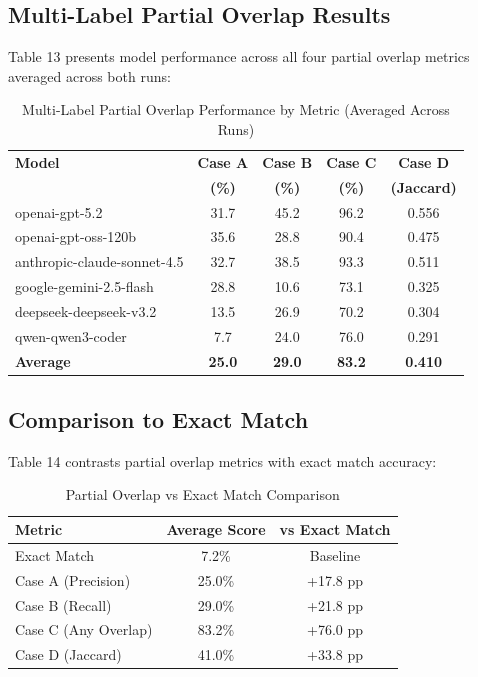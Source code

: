 \documentclass[12pt,a4paper]{article}
\begin{document}
\subsection{Multi-Label Partial Overlap Results}

Table 13 presents model performance across all four partial overlap metrics averaged across both runs:

\begin{table}[H]
\centering
\label{tab:partial_overlap}
\begin{tabular}{lcccc}
\toprule
\textbf{Model} & \textbf{Case A} & \textbf{Case B} & \textbf{Case C} & \textbf{Case D} \\
& \textbf{(\%)} & \textbf{(\%)} & \textbf{(\%)} & \textbf{(Jaccard)} \\
\midrule
openai-gpt-5.2 & 31.7 & 45.2 & 96.2 & 0.556 \\
openai-gpt-oss-120b & 35.6 & 28.8 & 90.4 & 0.475 \\
anthropic-claude-sonnet-4.5 & 32.7 & 38.5 & 93.3 & 0.511 \\
google-gemini-2.5-flash & 28.8 & 10.6 & 73.1 & 0.325 \\
deepseek-deepseek-v3.2 & 13.5 & 26.9 & 70.2 & 0.304 \\
qwen-qwen3-coder & 7.7 & 24.0 & 76.0 & 0.291 \\
\midrule
\textbf{Average} & \textbf{25.0} & \textbf{29.0} & \textbf{83.2} & \textbf{0.410} \\
\bottomrule
\end{tabular}
\caption{Multi-Label Partial Overlap Performance by Metric (Averaged Across Runs)}
\end{table}

\subsection{Comparison to Exact Match}

Table 14 contrasts partial overlap metrics with exact match accuracy:

\begin{table}[H]
\centering
\label{tab:overlap_vs_exact}
\begin{tabular}{lcc}
\toprule
\textbf{Metric} & \textbf{Average Score} & \textbf{vs Exact Match} \\
\midrule
Exact Match & 7.2\% & Baseline \\
Case A (Precision) & 25.0\% & +17.8 pp \\
Case B (Recall) & 29.0\% & +21.8 pp \\
Case C (Any Overlap) & 83.2\% & +76.0 pp \\
Case D (Jaccard) & 41.0\% & +33.8 pp \\
\bottomrule
\end{tabular}
\caption{Partial Overlap vs Exact Match Comparison}
\end{table}
\end{document}
